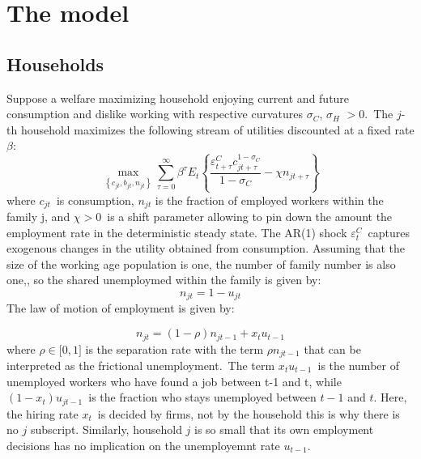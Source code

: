 \documentclass[a4paper,12pt]{article}%
\begin{document}
\section{The model}

\subsection{Households}

Suppose a welfare maximizing household enjoying current and future consumption
and dislike working with respective curvatures $\sigma_{C}$, $\sigma_{H}$
$>0$.\ The $j$-th household maximizes the following stream of utilities
discounted at a fixed rate $\beta$:%
\begin{equation}
\max_{\left\{  c_{jt},b_{jt},n_{jt}\right\}  }\sum_{\tau=0}^{\infty}%
\beta^{\tau}E_{t}\left\{  \frac{\varepsilon_{t+\tau}^{C}c_{jt+\tau}%
^{1-\sigma_{C}}}{1-\sigma_{C}}-\chi n_{jt+\tau}\right\}
\end{equation}
where $c_{jt}$\ is consumption, $n_{jt}$ is the fraction of employed workers
within the family j, and $\chi>0$\ is a shift parameter allowing to pin down
the amount the employment rate in the deterministic steady state. The AR(1)
shock $\varepsilon_{t}^{C}$\ captures exogenous changes in the utility
obtained from consumption. Assuming that the size of the working age
population is one, the number of family number is also one,, so the shared
unemploymed within the family is given by:%
\begin{equation}
n_{jt}=1-u_{jt}%
\end{equation}
The law of motion of employment is given by:%

\begin{equation}
n_{jt}=\left(  1-\rho\right)  n_{jt-1}+x_{t}u_{t-1}%
\end{equation}
where $\rho\in\lbrack0,1]$ is the separation rate with the term $\rho
n_{jt-1}$ that can be interpreted as the frictional unemployment.\ The term
$x_{t}u_{t-1}$\ is the number of unemployed workers who have found a job
between t-1 and t, while $(1-x_{t})u_{jt-1}$\ is the fraction who stays
unemployed between $t-1$ and $t$. Here, the hiring rate $x_{t}$\ is decided by
firms, not by the household this is why there is no $j$ subscript. Similarly,
household $j$ is so small that its own employment decisions has no implication
on the unemployemnt rate $u_{t-1}$.
\end{document}
